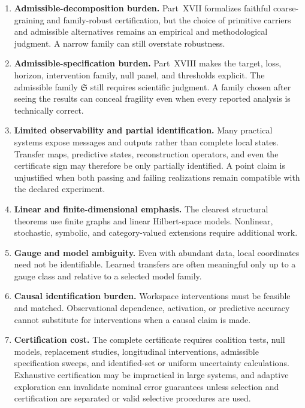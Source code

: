 \documentclass[11pt,letterpaper]{article}
\theoremstyle{plain}
\theoremstyle{definition}
\begin{document}
\begin{enumerate}
\item \textbf{Admissible-decomposition burden.} Part~XVII formalizes faithful coarse-graining and
family-robust certification, but the choice of primitive carriers and admissible alternatives remains an
empirical and methodological judgment. A narrow family can still overstate robustness.

\item \textbf{Admissible-specification burden.} Part~XVIII makes the target, loss, horizon,
intervention family, null panel, and thresholds explicit. The admissible family \(\mathfrak S\) still
requires scientific judgment. A family chosen after seeing the results can conceal fragility even when
every reported analysis is technically correct.

\item \textbf{Limited observability and partial identification.} Many practical systems expose messages
and outputs rather than complete local states. Transfer maps, predictive states, reconstruction operators,
and even the certificate sign may therefore be only partially identified. A point claim is unjustified
when both passing and failing realizations remain compatible with the declared experiment.

\item \textbf{Linear and finite-dimensional emphasis.} The clearest structural theorems use finite graphs
and linear Hilbert-space models. Nonlinear, stochastic, symbolic, and category-valued extensions require
additional work.

\item \textbf{Gauge and model ambiguity.} Even with abundant data, local coordinates need not be
identifiable. Learned transfers are often meaningful only up to a gauge class and relative to a selected
model family.

\item \textbf{Causal identification burden.} Workspace interventions must be feasible and matched.
Observational dependence, activation, or predictive accuracy cannot substitute for interventions when a
causal claim is made.

\item \textbf{Certification cost.} The complete certificate requires coalition tests, null models,
replacement studies, longitudinal interventions, admissible specification sweeps, and identified-set or
uniform uncertainty calculations. Exhaustive certification may be impractical in large systems, and
adaptive exploration can invalidate nominal error guarantees unless selection and certification are
separated or valid selective procedures are used.


\end{enumerate}
\end{document}
